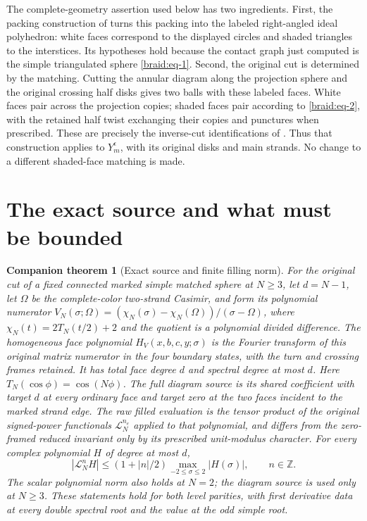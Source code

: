 \documentclass[11pt]{article}
\numberwithin{equation}{section}
\newtheorem{foundation}{Companion theorem}
\begin{document}
The complete-geometry assertion used below has two ingredients. First,
the packing construction of \cite[Proposition 2.1]{MarkedFillings} turns
this packing into the labeled right-angled ideal polyhedron: white
faces correspond to the displayed circles and shaded triangles to the
interstices. Its hypotheses hold because the contact graph just
computed is the simple triangulated sphere \eqref{braid:eq-1}.
Second, the original cut is determined by the matching. Cutting the
annular diagram along the projection sphere and the original crossing
half disks gives two balls with these labeled faces. White faces pair
across the projection copies; shaded faces pair according to
\eqref{braid:eq-2}, with the retained half twist exchanging their copies
and punctures when prescribed. These are precisely the inverse-cut
identifications of \cite[Section 2]{MarkedFillings}. Thus that construction
applies to \(Y_m^\epsilon\), with its original disks and main strands.
No change to a different shaded-face matching is made.

\section{The exact source and what must be
bounded}\label{source:sec-2}


\begin{foundation}[Exact source and finite filling norm]\label{found:finite}
For the original cut of a fixed connected marked simple matched sphere
at \(N\ge3\), let \(d=N-1\), let \(\Omega\) be the complete-color two-strand Casimir,
and form its polynomial numerator
\(V_N(\sigma;\Omega)=(\chi_N(\sigma)-\chi_N(\Omega))/(\sigma-\Omega)\), where $\chi_N(t)=2T_N(t/2)+2$ and the quotient is a polynomial divided difference.
The homogeneous face polynomial \(H_V(x,b,c,y;\sigma)\) is the Fourier
transform of this original matrix numerator in the four boundary
states, with the turn and crossing frames retained. It has total face
degree \(d\) and spectral degree at most \(d\).
Here \(T_N(\cos\phi)=\cos(N\phi)\). The full diagram source is its shared coefficient with target \(d\)
at every ordinary face and target zero at the two faces incident to
the marked strand edge. The raw filled evaluation is the tensor product
of the original signed-power functionals \(\mathcal L_N^{n_e}\) applied
to that polynomial, and differs from the zero-framed reduced invariant
only by its prescribed unit-modulus character. For every complex
polynomial \(H\) of degree at most \(d\),
\[
 |\mathcal L_N^n H|\le (1+|n|/2)\max_{-2\le\sigma\le2}|H(\sigma)|,
 \qquad n\in\mathbb Z.
\]
The scalar polynomial norm also holds at \(N=2\); the diagram source
is used only at \(N\ge3\). These statements hold for both level parities, with first derivative data
at every double spectral root and the value at the odd simple root.
\end{foundation}
\end{document}
